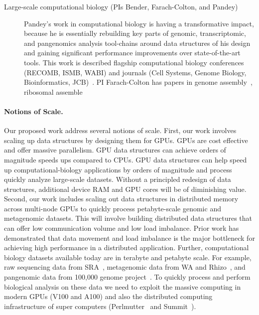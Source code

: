 \begin{description}
    \item[Large-scale computational biology (PIs Bender, Farach-Colton, and Pandey)] Pandey's work in computational biology is having a transformative impact, because he is essentially rebuilding key parts of genomic, transcriptomic, and pangenomics analysis tool-chains around data structures of his design and gaining significant performance improvements over state-of-the-art tools. This work is described flagship computational biology conferences (RECOMB, ISMB, WABI) and journals (Cell Systems, Genome Biology, Bioinformatics, JCB)~\cite{PandeyABFJP18Cell,PandeyBJP17a,PandeyBJP17b,AlmodaresiPFJP19,AlmodaresiPFJP20,pandey2021variantstore,almodaresi2017rainbowfish,almodaresi2022incrementally}.  PI Farach-Colton has papers in genome assembly~\cite{vicky-choi}, ribosomal assemble~\cite{gabriela-hristescu}

\end{description}


\paragraph{Notions of Scale.}
Our proposed work address several notions of scale.
First, our work involves scaling up data structures by designing them for GPUs. GPUs are cost effective and offer massive parallelism. GPU data structures can achieve orders of magnitude speeds ups compared to CPUs. GPU data structures can help speed up computational-biology applications by orders of magnitude and process quickly analyze large-scale datasets. Without a principled redesign of data structures, additional device RAM and GPU cores will be of diminishing value.
Second, our work includes scaling out data structures in distributed memory across multi-node GPUs to quickly process petabyte-scale genomic and metagenomic datasets. This will involve building distributed data structures that can offer low communication volume and low load imbalance. Prior work has demonstrated that data movement and load imbalance is the major bottleneck for achieving high performance in a distributed application.
Further, computational biology datasets available today are in terabyte and petabyte scale. For example, raw sequencing data from SRA~\cite{kodama2012sequence}, metagenomic data from WA and Rhizo~\cite{hofmeyr2020terabase}, and pangenomic data from 100,000 genome project~\cite{1002021100}. To quickly process and perform biological analysis on these data we need to exploit the massive computing in modern GPUs (V100 and A100) and also the distributed computing infrastructure of super computers (Perlmutter~\cite{perlmutter} and Summit~\cite{summit}).
